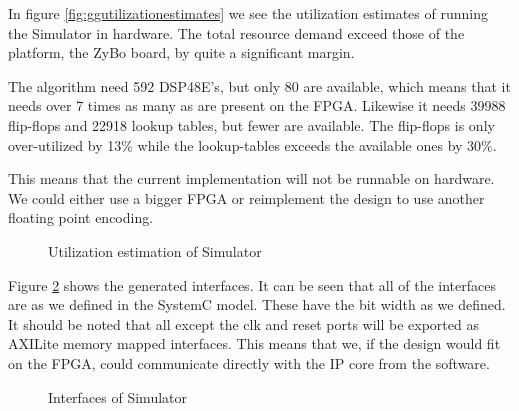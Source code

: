 In figure \ref{fig:ggutilizationestimates} we see the utilization estimates of running the Simulator in hardware. The total resource demand exceed those of the platform, the ZyBo board, by quite a significant margin. 

The algorithm need 592 DSP48E's, but only 80 are available, which means that it needs over 7 times as many as are present on the FPGA. Likewise it needs 39988 flip-flops and 22918 lookup tables, but fewer are available. The flip-flops is only over-utilized by 13\% while the lookup-tables exceeds the available ones by 30\%. 

This means that the current implementation will not be runnable on hardware. We could either use a bigger FPGA or reimplement the design to use another floating point encoding.

\begin{figure}[h!]
	\centering
	\caption{Utilization estimation of Simulator}
	\label{fig:simutilizationestimates}
\end{figure}

Figure \ref{fig:siminterface} shows the generated interfaces. It can be seen that all of the interfaces are as we defined in the SystemC model. These have the bit width as we defined. It should be noted that all except the clk and reset ports will be exported as AXILite memory mapped interfaces. This means that we, if the design would fit on the FPGA, could communicate directly with the IP core from the software.

\begin{figure}[h!]
	\centering
	\caption{Interfaces of Simulator}
	\label{fig:siminterface}
\end{figure}

